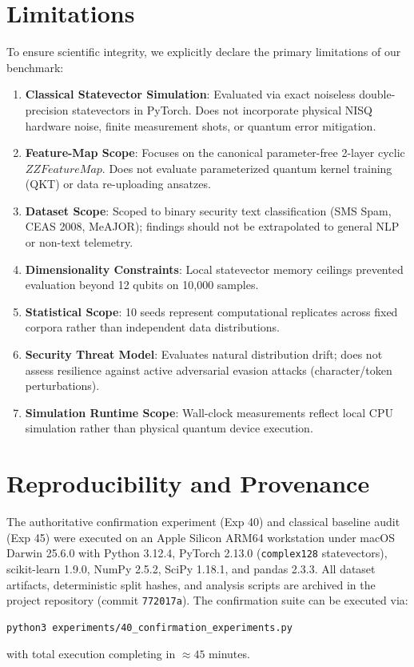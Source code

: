 \documentclass[10pt,twocolumn,letterpaper]{article}
\begin{document}
\section{Limitations}
\label{sec:limits}
To ensure scientific integrity, we explicitly declare the primary limitations of our benchmark:
\begin{enumerate}
    \item \textbf{Classical Statevector Simulation}: Evaluated via exact noiseless double-precision statevectors in PyTorch. Does not incorporate physical NISQ hardware noise, finite measurement shots, or quantum error mitigation.
    \item \textbf{Feature-Map Scope}: Focuses on the canonical parameter-free 2-layer cyclic $ZZFeatureMap$. Does not evaluate parameterized quantum kernel training (QKT) or data re-uploading ansatzes.
    \item \textbf{Dataset Scope}: Scoped to binary security text classification (SMS Spam, CEAS 2008, MeAJOR); findings should not be extrapolated to general NLP or non-text telemetry.
    \item \textbf{Dimensionality Constraints}: Local statevector memory ceilings prevented evaluation beyond 12 qubits on 10,000 samples.
    \item \textbf{Statistical Scope}: 10 seeds represent computational replicates across fixed corpora rather than independent data distributions.
    \item \textbf{Security Threat Model}: Evaluates natural distribution drift; does not assess resilience against active adversarial evasion attacks (character/token perturbations).
    \item \textbf{Simulation Runtime Scope}: Wall-clock measurements reflect local CPU simulation rather than physical quantum device execution.
\end{enumerate}

\section{Reproducibility and Provenance}
\label{sec:repro}
The authoritative confirmation experiment (Exp 40) and classical baseline audit (Exp 45) were executed on an Apple Silicon ARM64 workstation under macOS Darwin 25.6.0 with Python 3.12.4, PyTorch 2.13.0 (\texttt{complex128} statevectors), scikit-learn 1.9.0, NumPy 2.5.2, SciPy 1.18.1, and pandas 2.3.3. All dataset artifacts, deterministic split hashes, and analysis scripts are archived in the project repository (commit \texttt{772017a}). The confirmation suite can be executed via:
\begin{verbatim}
python3 experiments/40_confirmation_experiments.py
\end{verbatim}
with total execution completing in $\approx 45$ minutes.
\end{document}
